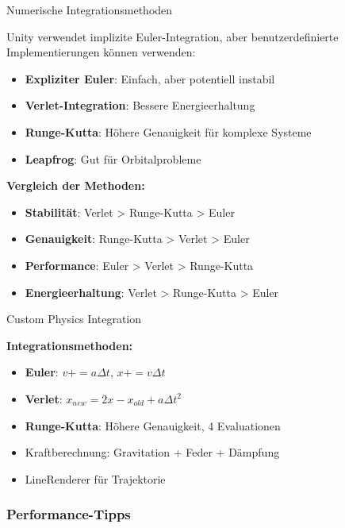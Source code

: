 \begin{concept}{Numerische Integrationsmethoden}

    Unity verwendet implizite Euler-Integration, aber benutzerdefinierte Implementierungen können verwenden:
    \begin{itemize}
        \item \textbf{Expliziter Euler}: Einfach, aber potentiell instabil
        \item \textbf{Verlet-Integration}: Bessere Energieerhaltung
        \item \textbf{Runge-Kutta}: Höhere Genauigkeit für komplexe Systeme
        \item \textbf{Leapfrog}: Gut für Orbitalprobleme
    \end{itemize}
    
    \textbf{Vergleich der Methoden:}
    \begin{itemize}
        \item \textbf{Stabilität}: Verlet > Runge-Kutta > Euler
        \item \textbf{Genauigkeit}: Runge-Kutta > Verlet > Euler
        \item \textbf{Performance}: Euler > Verlet > Runge-Kutta
        \item \textbf{Energieerhaltung}: Verlet > Runge-Kutta > Euler
    \end{itemize}
\end{concept}

\begin{concept}{Custom Physics Integration}

    \textbf{Integrationsmethoden:}
    \begin{itemize}
        \item \textbf{Euler}: $v += a \Delta t$, $x += v \Delta t$
        \item \textbf{Verlet}: $x_{new} = 2x - x_{old} + a \Delta t^2$
        \item \textbf{Runge-Kutta}: Höhere Genauigkeit, 4 Evaluationen
        \item Kraftberechnung: Gravitation + Feder + Dämpfung
        \item LineRenderer für Trajektorie
    \end{itemize}
\end{concept}

\subsubsection{Performance-Tipps}

